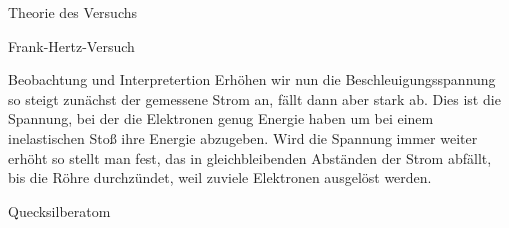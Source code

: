 \documentclass[pdftex, a4paper,11pt, twoside, ngerman]{report}
\begin{document}
\begin{chapter}{Theorie des Versuchs}
\begin{section}{Frank-Hertz-Versuch}
      
      
      \begin{subsection}{Beobachtung und Interpretertion}
        Erhöhen wir nun die Beschleuigungsspannung so steigt zunächst der
        gemessene Strom an, fällt dann aber stark ab. Dies ist die Spannung,
        bei der die Elektronen genug Energie haben um bei einem inelastischen
        Stoß ihre Energie abzugeben. Wird die Spannung immer weiter erhöht so
        stellt man fest, das in gleichbleibenden Abständen der Strom abfällt,
        bis die Röhre durchzündet, weil zuviele Elektronen ausgelöst werden. 

      \end{subsection}
      
      
      
      \begin{subsection}{Quecksilberatom}
        
        
      \end{subsection}
      
    \end{section}
    
  \end{chapter}
         
         
         
\end{document}
